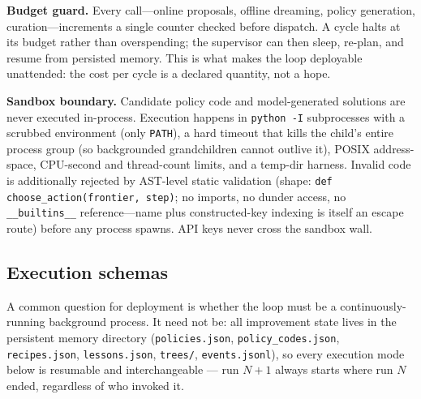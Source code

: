 \documentclass[11pt,a4paper]{article}
\newcommand{\hdr}[1]{\textbf{#1}}
\begin{document}
\hdr{Budget guard.} Every call---online proposals, offline dreaming, policy
generation, curation---increments a single counter checked before dispatch.
A cycle halts at its budget rather than overspending; the supervisor can then
sleep, re-plan, and resume from persisted memory. This is what makes the loop
deployable unattended: the cost per cycle is a declared quantity, not a hope.

\hdr{Sandbox boundary.} Candidate policy code and model-generated solutions
are never executed in-process. Execution happens in
\texttt{python~-I} subprocesses with a scrubbed environment (only
\texttt{PATH}), a hard timeout that kills the child's entire process group
(so backgrounded grandchildren cannot outlive it), POSIX address-space,
CPU-second and thread-count limits, and a temp-dir harness.
Invalid code is additionally rejected by AST-level static validation (shape:
\texttt{def choose\_action(frontier, step)}; no imports, no dunder access, no
\texttt{\_\_builtins\_\_} reference---name plus constructed-key indexing is
itself an escape route) before any process spawns. API keys never cross the
sandbox wall.

\subsection{Execution schemas}
\label{sec:execution}

A common question for deployment is whether the loop must be a
continuously-running background process. It need not be: all improvement
state lives in the persistent memory directory
(\texttt{policies.json}, \texttt{policy\_codes.json}, \texttt{recipes.json},
\texttt{lessons.json}, \texttt{trees/}, \texttt{events.jsonl}), so every
execution mode below is resumable and interchangeable --- run $N{+}1$ always
starts where run $N$ ended, regardless of who invoked it.
\end{document}

